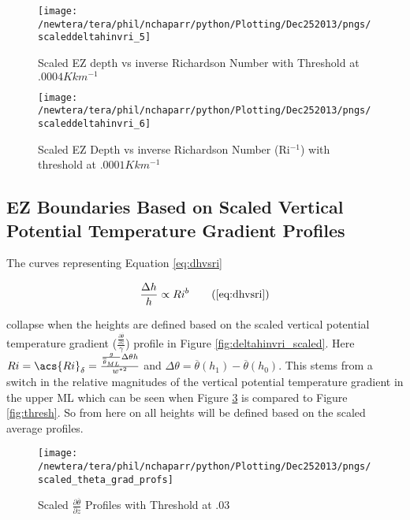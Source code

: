 \begin{figure}[htbp]
    \centering
    \texttt{[image: /newtera/tera/phil/nchaparr/python/Plotting/Dec252013/pngs/scaleddeltahinvri\_5]}
    \caption{Scaled EZ depth vs inverse Richardson Number with Threshold at $.0004Kkm^{-1}$}
    \label{fig:scaledeltahinvri1}   %
\end{figure}

\begin{figure}[htbp]
    \centering
    \texttt{[image: /newtera/tera/phil/nchaparr/python/Plotting/Dec252013/pngs/scaleddeltahinvri\_6]}
    \caption{Scaled EZ Depth vs inverse Richardson Number (\acs{Ri}$^{-1}$) with threshold at $.0001Kkm^{-1}$}
    \label{fig:scaledeltahinvri2}   %
\end{figure}

\clearpage
\subsection{\acs{EZ} Boundaries Based on Scaled Vertical Potential Temperature Gradient Profiles}
\label{subsec:ellimscaledprof}

The curves representing Equation \ref{eq:dhvsri} 

\begin{equation}
\frac{\Delta h}{h} \propto Ri^{b} \tag{\ref{eq:dhvsri}}
\end{equation}

collapse when the heights are defined based on the scaled vertical potential temperature gradient 
($\frac{\frac{\partial \overline{\theta}}{\partial z}}{\gamma}$) profile in Figure \ref{fig:deltahinvri_scaled}.  Here $Ri = \acs{Ri}_{\delta}=\frac{\frac{g}{\overline{\theta}_{ML}} \Delta \theta h}{w^{*2}}$ and $\Delta \theta = \overline{\theta}(h_{1}) - \overline{\theta}(h_{0})$.  This stems
from a switch in the relative magnitudes of the vertical potential temperature gradient in the upper \acs{ML} which can be seen when Figure \ref{fig:thresh3} is compared to Figure \ref{fig:thresh}. So from here on all heights will be defined based on the scaled average profiles.   
\\

\begin{figure}[htbp]
    \centering
    \texttt{[image: /newtera/tera/phil/nchaparr/python/Plotting/Dec252013/pngs/scaled\_theta\_grad\_profs]}
    \caption{Scaled $\frac{\partial \overline{\theta}}{\partial z}$ Profiles with Threshold at .03}
    \label{fig:thresh3}   %
\end{figure}

